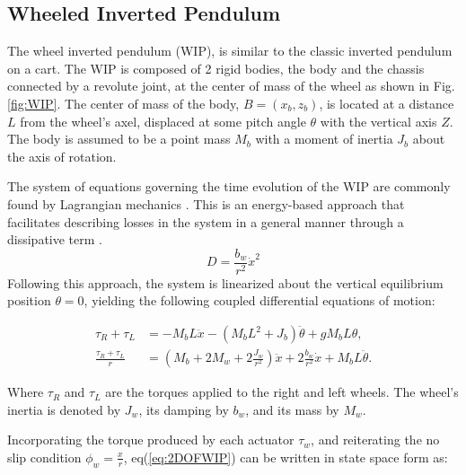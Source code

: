     \subsection{Wheeled Inverted Pendulum}
    The wheel inverted pendulum (WIP), is similar to the classic inverted pendulum on a cart. 
    The WIP is composed of 2 rigid bodies, the body and the chassis connected by a revolute joint, 
    at the center of mass of the wheel as shown in Fig.\ref{fig:WIP}. 
    The center of mass of the body, $B=(x_b,z_b)$, 
    is located at a distance $L$ from the wheel's axel, displaced at some pitch angle $\theta$ with 
    the vertical axis $Z$. The body is assumed to be a point mass $M_b$ with a moment of inertia $J_b$ 
    about the axis of rotation. 
    
    The system of equations governing the time evolution of the WIP are 
    commonly found by Lagrangian mechanics \cite{AdvancedWIP}. This is an energy-based approach that
    facilitates describing losses in the system in a general manner through a 
    dissipative term \cite{frankovsky2017modeling} \cite{ModelingWIPLagrange}.
    \begin{equation}
        D = \frac{b_w}{r^2} \dot{x}^2
    \end{equation}
    Following this approach, the system is linearized about the vertical equilibrium position $\theta = 0$,
    yielding the following coupled differential equations of motion:

    \begin{subequations}
        \begin{align}
            \tau_R + \tau_L &= - M_b L \ddot{x}  
            - (M_b L^2 + J_b) \ddot{\theta}  
            + g M_b L \theta, \\
            \frac{\tau_R + \tau_L}{r} &= \left( M_b + 2M_w + 2\frac{J_w}{r^2} \right) \ddot{x}  
            + 2\frac{b_w}{r^2} \dot{x}  
            + M_b L \ddot{\theta}.
        \end{align}
        \label{eq:2DOFWIP}
    \end{subequations}

    Where $\tau_R$ and $\tau_L$ are the torques applied to the right and left wheels. 
    The wheel's inertia is denoted by $J_w$, its damping by $b_w$, and its mass by $M_w$. 

    Incorporating the torque produced by each actuator $\tau_w$, 
    and reiterating the no slip condition $\phi_w = \frac{x}{r}$,
    eq(\ref{eq:2DOFWIP}) can be written in state space form as:


